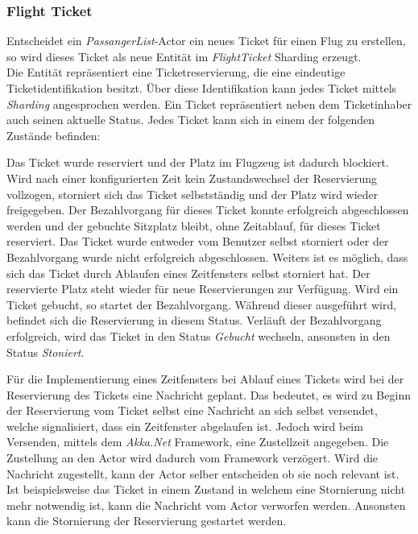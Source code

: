\subsubsection{Flight Ticket}
Entscheidet ein \textit{PassangerList}-Actor ein neues Ticket für einen Flug zu erstellen, so wird dieses Ticket als neue Entität im \textit{FlightTicket} Sharding erzeugt. \\
Die Entität repräsentiert eine Ticketreservierung, die eine eindeutige Ticketidentifikation besitzt. Über diese Identifikation kann jedes Ticket mittels \textit{Sharding} angesprochen werden. Ein Ticket repräsentiert neben dem Ticketinhaber auch seinen aktuelle Status. Jedes Ticket kann sich in einem der folgenden Zustände befinden:
\begin{enumerate}
   Das Ticket wurde reserviert und der Platz im Flugzeug ist dadurch blockiert. Wird nach einer konfigurierten Zeit kein Zustandswechsel der Reservierung vollzogen, storniert sich das Ticket selbstständig und der Platz wird wieder freigegeben.
   Der Bezahlvorgang für dieses Ticket konnte erfolgreich abgeschlossen werden und der gebuchte Sitzplatz bleibt, ohne Zeitablauf, für dieses Ticket reserviert.
   Das Ticket wurde entweder vom Benutzer selbst storniert oder der Bezahlvorgang wurde nicht erfolgreich abgeschlossen. Weiters ist es möglich, dass sich das Ticket durch Ablaufen eines Zeitfensters selbst storniert hat. Der reservierte Platz steht wieder für neue Reservierungen zur Verfügung.
   Wird ein Ticket gebucht, so startet der Bezahlvorgang. Während dieser ausgeführt wird, befindet sich die Reservierung in diesem Status. Verläuft der Bezahlvorgang erfolgreich, wird das Ticket in den Status \textit{Gebucht} wechseln, ansonsten in den Status \textit{Stoniert}.
\end{enumerate}
Für die Implementierung eines Zeitfensters bei Ablauf eines Tickets wird bei der Reservierung des Tickets eine Nachricht geplant. 
Das bedeutet, es wird zu Beginn der Reservierung vom Ticket selbst eine Nachricht an sich selbst versendet, welche signalisiert, dass ein Zeitfenster abgelaufen ist. Jedoch wird beim Versenden, mittels dem \textit{Akka.Net} Framework, eine Zustellzeit angegeben. Die Zustellung an den Actor wird dadurch vom Framework verzögert. Wird die Nachricht zugestellt, kann der Actor selber entscheiden ob sie noch relevant ist. Ist beispielsweise das Ticket in einem Zustand in welchem eine Stornierung nicht mehr notwendig ist, kann die Nachricht vom Actor verworfen werden. Ansonsten kann die Stornierung der Reservierung gestartet werden. \\

